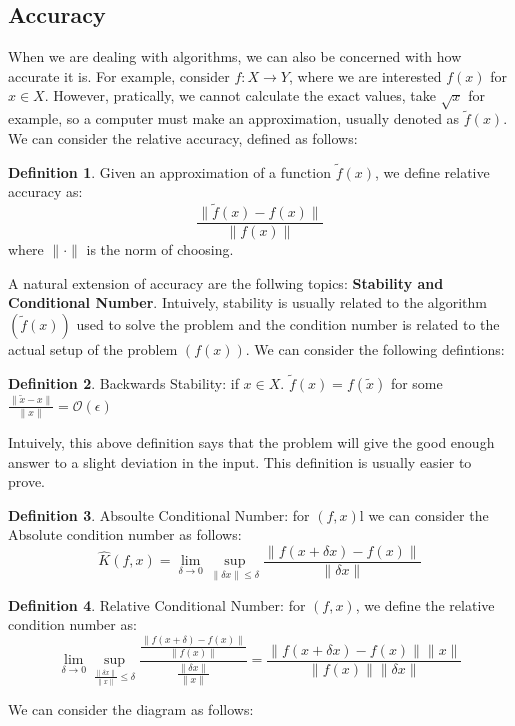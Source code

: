 \documentclass[11pt]{article}
\theoremstyle{definition}
\newtheorem{definition}{Definition}[section]
\begin{document}
\subsection{Accuracy} 
When we are dealing with algorithms, we can also be concerned with how accurate it is. For example, consider $f: X \to Y$, where we are interested $f(x)$ for $x \in X$. However, pratically, we cannot calculate the exact values, take $\sqrt{x}$ for example, so a computer must make an approximation, usually denoted as $\tilde{f}(x)$. We can consider the relative accuracy, defined as follows:
\begin{definition}
  Given an approximation of a function $\tilde{f}(x)$, we define relative accuracy as:
  \[
  \frac{\|\tilde{f}(x) - f(x)\|}{\|f(x)\|}
  \]
  where $\| \cdot \|$ is the norm of choosing. 
\end{definition}
A natural extension of accuracy are the follwing topics: \textbf{Stability and Conditional Number}. Intuively, stability is usually related to the algorithm $(\tilde{f}(x))$ used to solve the problem and the condition number is related to the actual setup of the problem $(f(x))$. We can consider the following defintions:
\begin{definition}
  Backwards Stability: if $x \in X$. $\tilde{f}(x) = f(\tilde{x})$ for some $\frac{\| \tilde{x} - x \|}{\|x\|} = \mathcal{O}(\epsilon)$
\end{definition}
Intuively, this above definition says that the problem will give the good enough answer to a slight deviation in the input. This definition is usually easier to prove. 
\begin{definition}
  Absoulte Conditional Number: for $(f, x)$l we can consider the Absolute condition number as follows:
  \[
  \hat{K}(f, x) = \lim_{\delta \to 0} \sup_{\|\delta x \| \leq \delta} \frac{\|f(x+\delta x) -f(x)\|}{\|\delta x\|} 
  \]
\end{definition}
\begin{definition}
  Relative Conditional Number: for $(f,x)$, we define the relative condition number as:
  \[
  \lim_{\delta \to 0} \sup_{\frac{\| \delta x \|}{\|x\|} \leq \delta} \frac{\frac{\|f(x + \delta) - f(x)\|}{\|f(x)\|}}{\frac{\| \delta x \|}{\|x\|}} = \frac{\|f(x+ \delta x) - f(x)\| \|x\|}{\| f(x) \| \|\delta x \|}
  \]
\end{definition}
We can consider the diagram as follows:
\end{document}
